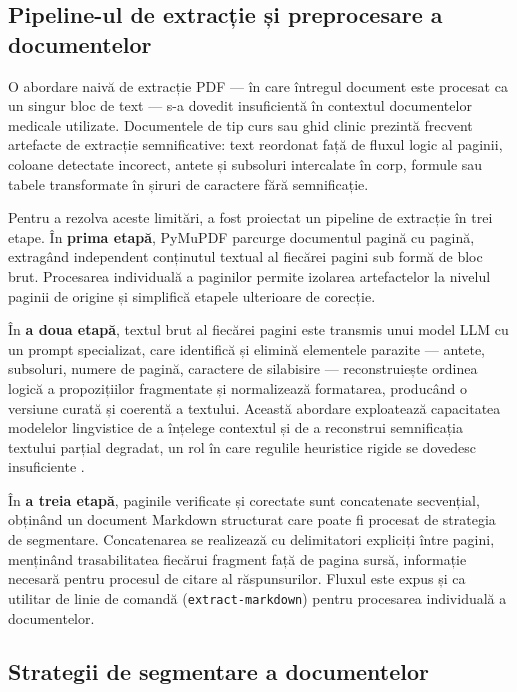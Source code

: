 \documentclass[12pt, a4paper, oneside, romanian]{teza-upb}
\begin{document}
\subsection{Pipeline-ul de extracție și preprocesare a documentelor}

O abordare naivă de extracție PDF — în care întregul document este procesat ca un singur bloc de text — s-a dovedit insuficientă în contextul documentelor medicale utilizate. Documentele de tip curs sau ghid clinic prezintă frecvent artefacte de extracție semnificative: text reordonat față de fluxul logic al paginii, coloane detectate incorect, antete și subsoluri intercalate în corp, formule sau tabele transformate în șiruri de caractere fără semnificație.

Pentru a rezolva aceste limitări, a fost proiectat un pipeline de extracție în trei etape. În \textbf{prima etapă}, PyMuPDF parcurge documentul pagină cu pagină, extragând independent conținutul textual al fiecărei pagini sub formă de bloc brut. Procesarea individuală a paginilor permite izolarea artefactelor la nivelul paginii de origine și simplifică etapele ulterioare de corecție.

În \textbf{a doua etapă}, textul brut al fiecărei pagini este transmis unui model LLM cu un prompt specializat, care identifică și elimină elementele parazite — antete, subsoluri, numere de pagină, caractere de silabisire — reconstruiește ordinea logică a propozițiilor fragmentate și normalizează formatarea, producând o versiune curată și coerentă a textului. Această abordare exploatează capacitatea modelelor lingvistice de a înțelege contextul și de a reconstrui semnificația textului parțial degradat, un rol în care regulile heuristice rigide se dovedesc insuficiente \cite{llm_review_2024}.

În \textbf{a treia etapă}, paginile verificate și corectate sunt concatenate secvențial, obținând un document Markdown structurat care poate fi procesat de strategia de segmentare. Concatenarea se realizează cu delimitatori expliciți între pagini, menținând trasabilitatea fiecărui fragment față de pagina sursă, informație necesară pentru procesul de citare al răspunsurilor. Fluxul este expus și ca utilitar de linie de comandă (\texttt{extract-markdown}) pentru procesarea individuală a documentelor.

\subsection{Strategii de segmentare a documentelor}
\end{document}
